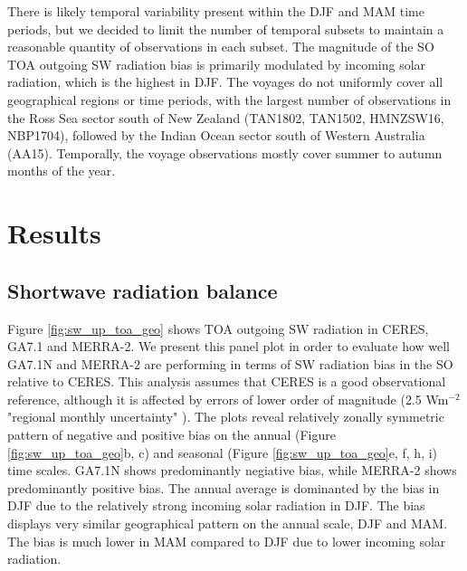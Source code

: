 There is likely temporal variability present within the DJF and MAM
time periods, but we decided to limit the number of temporal subsets
to maintain a reasonable quantity of observations in each subset.
The magnitude of the SO TOA outgoing SW radiation bias is primarily modulated
by incoming solar radiation, which is the highest in DJF.
The voyages do not uniformly cover all geographical regions or time periods,
with the largest number of observations in the Ross Sea sector south of New
Zealand (TAN1802, TAN1502, HMNZSW16, NBP1704), followed by the Indian Ocean
sector south of Western Australia (AA15). Temporally, the voyage observations
mostly cover summer to autumn months of the year.

\section{Results}

\subsection{Shortwave radiation balance}
\label{sec:sw-radiation-balance}

Figure \ref{fig:sw_up_toa_geo} shows TOA outgoing SW radiation in CERES, GA7.1
and MERRA-2. We present this panel plot in order to evaluate how well GA7.1N and
MERRA-2 are performing in terms of SW radiation bias in the SO relative to
CERES. This analysis assumes that CERES is a good observational reference,
although it is affected by errors of lower order of magnitude (2.5 Wm$^{-2}$
"regional monthly uncertainty" \citep[sec. 4a.]{loeb2018}). The plots reveal
relatively zonally symmetric pattern of negative and positive bias on the
annual (Figure \ref{fig:sw_up_toa_geo}b, c) and seasonal (Figure
\ref{fig:sw_up_toa_geo}e, f, h, i) time scales. GA7.1N shows predominantly
negiative bias, while MERRA-2 shows predominantly positive bias. The annual
average is dominanted by the bias in DJF due to the relatively strong incoming
solar radiation in DJF. The bias displays very similar geographical pattern on
the annual scale, DJF and MAM. The bias is much lower in MAM compared to DJF
due to lower incoming solar radiation.

